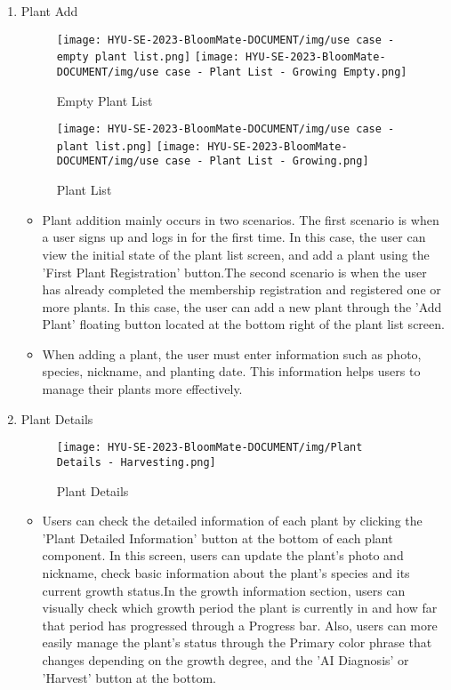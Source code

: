 \documentclass[conference, a4paper]{IEEEtran}
\begin{document}
\begin{enumerate}
    \item Plant Add
    \begin{figure}[h]
    \centerline{
        \texttt{[image: HYU-SE-2023-BloomMate-DOCUMENT/img/use case - empty plant list.png]}
        \texttt{[image: HYU-SE-2023-BloomMate-DOCUMENT/img/use case - Plant List - Growing Empty.png]}
    }
    \label{fig}
    \caption{Empty Plant List}
    \end{figure}

    \begin{figure}[h]
    \centerline{
        \texttt{[image: HYU-SE-2023-BloomMate-DOCUMENT/img/use case - plant list.png]}
        \texttt{[image: HYU-SE-2023-BloomMate-DOCUMENT/img/use case - Plant List - Growing.png]}
    }
    \label{fig}
    \caption{Plant List}
    \end{figure}
    \begin{itemize}
        \item Plant addition mainly occurs in two scenarios. The first scenario is when a user signs up and logs in for the first time. In this case, the user can view the initial state of the plant list screen, and add a plant using the 'First Plant Registration' button.The second scenario is when the user has already completed the membership registration and registered one or more plants. In this case, the user can add a new plant through the 'Add Plant' floating button located at the bottom right of the plant list screen.
        \item When adding a plant, the user must enter information such as photo, species, nickname, and planting date. This information helps users to manage their plants more effectively.
    \end{itemize}

    
    \item Plant Details
        \begin{figure}[h]
        \centering
        \texttt{[image: HYU-SE-2023-BloomMate-DOCUMENT/img/Plant Details - Harvesting.png]}
        \caption{Plant Details}
        \label{fig:Plant Details}
        \end{figure}
    \begin{itemize}
        \item Users can check the detailed information of each plant by clicking the 'Plant Detailed Information' button at the bottom of each plant component. In this screen, users can update the plant's photo and nickname, check basic information about the plant's species and its current growth status.In the growth information section, users can visually check which growth period the plant is currently in and how far that period has progressed through a Progress bar. Also, users can more easily manage the plant's status through the Primary color phrase that changes depending on the growth degree, and the 'AI Diagnosis' or 'Harvest' button at the bottom.
    \end{itemize}
    

\end{enumerate}
\end{document}

